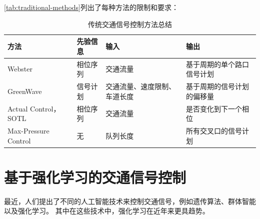 \autoref{tab:traditional-methods}列出了每种方法的限制和要求：
\begin{table}[htb]
    \caption{传统交通信号控制方法总结\label{tab:traditional-methods}}
    \begin{tabular}{llll}
      \toprule
      方法 & 先验信息 & 输入 & 输出 \\
      \midrule
      Webster & 相位序列 & 交通流量 & 基于周期的单个路口信号计划 \\
      GreenWave & 信号计划 & 交通流量、速度限制、车道长度 & 基于周期的信号计划的偏移量 \\
      Actual Control， SOTL & 相位序列& 交通流量 & 是否变化到下一个相位\\
      Max-Pressure Control & 无 & 队列长度 & 所有交叉口的信号计划\\
      \bottomrule
    \end{tabular}
\end{table}

\section{基于强化学习的交通信号控制}
最近，人们提出了不同的人工智能技术来控制交通信号，例如遗传算法、群体智能以及强化学习。 其中在这些技术中，强化学习在近年来更具趋势。

